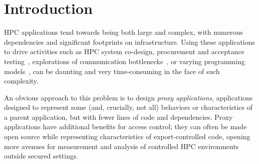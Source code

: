 \section{Introduction}
\label{sec:intro}
HPC applications tend towards being both large and complex, with numerous dependencies and significant footprints on infrastructure.
Using these applications to drive activities such as HPC system co-design, procurement and acceptance testing~\cite{larrea2020towards}, explorations of communication bottlenecks~\cite{aaziz2019fine}, or varying programming models~\cite{hochstein2005parallel}, can be daunting and very time-consuming in the face of such complexity.

An obvious approach to this problem is to design \emph{proxy applications}, applications designed to represent some (and, crucially, not all) behaviors or characteristics of a parent application, but with fewer lines of code and dependencies.  Proxy applications have additional benefits for access control; they can often be made open source while representing characteristics of export-controlled code, opening more avenues for measurement and analysis of controlled HPC environments outside secured settings.
%


